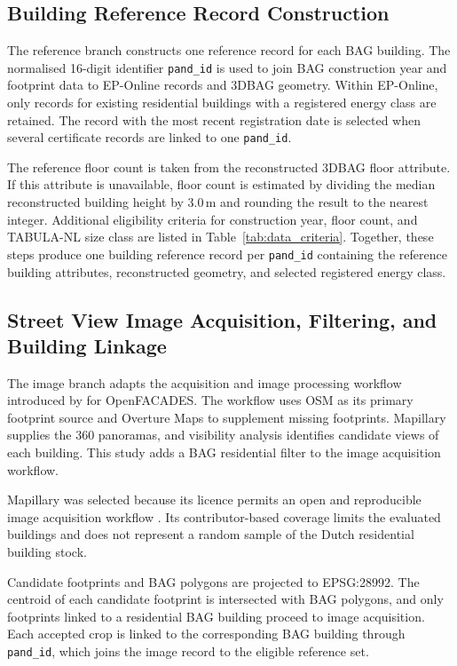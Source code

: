 \subsection{Building Reference Record Construction}
\label{sec:reference_dataset_construction}

The reference branch constructs one reference record for each BAG building. The normalised 16-digit identifier \texttt{pand\_id} is used to join BAG construction year and footprint data to EP-Online records and 3DBAG geometry. Within EP-Online, only records for existing residential buildings with a registered energy class are retained. The record with the most recent registration date is selected when several certificate records are linked to one \texttt{pand\_id}.

The reference floor count is taken from the reconstructed 3DBAG floor attribute. If this attribute is unavailable, floor count is estimated by dividing the median reconstructed building height by 3.0\,m and rounding the result to the nearest integer. Additional eligibility criteria for construction year, floor count, and TABULA-NL size class are listed in Table~\ref{tab:data_criteria}. Together, these steps produce one building reference record per \texttt{pand\_id} containing the reference building attributes, reconstructed geometry, and selected registered energy class.

\subsection{Street View Image Acquisition, Filtering, and Building Linkage}
\label{sec:svi_acquisition_matching}

The image branch adapts the acquisition and image processing workflow introduced by \textcite{liang2025} for OpenFACADES.
The workflow uses \acs{OSM} as its primary footprint source and Overture Maps to supplement missing footprints.
Mapillary supplies the 360\textdegree{} panoramas, and visibility analysis identifies candidate views of each building.
This study adds a \acs{BAG} residential filter to the image acquisition workflow.

Mapillary was selected because its licence permits an open and reproducible image acquisition workflow \parencite{mapillary}.
Its contributor-based coverage limits the evaluated buildings and does not represent a random sample of the Dutch residential building stock.

Candidate footprints and \acs{BAG} polygons are projected to EPSG:28992.
The centroid of each candidate footprint is intersected with \acs{BAG} polygons, and only footprints linked to a residential \acs{BAG} building proceed to image acquisition.
Each accepted crop is linked to the corresponding \acs{BAG} building through \texttt{pand\_id}, which joins the image record to the eligible reference set.

